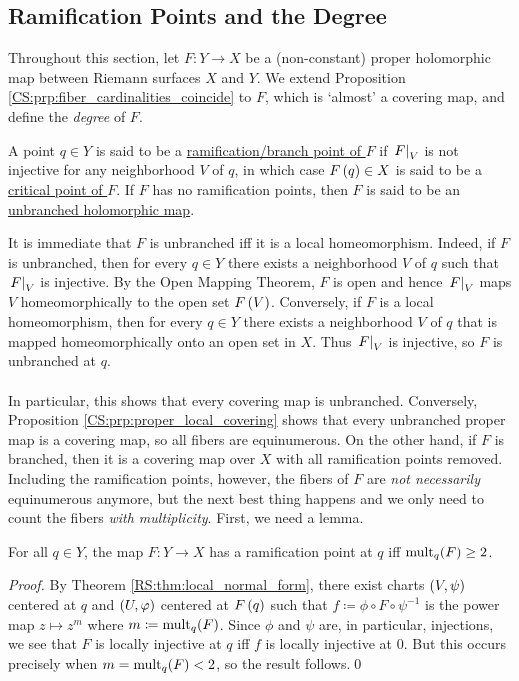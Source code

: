\documentclass[../Moduli_Spaces_of_Riemann_Surfaces.tex]{subfiles}
\begin{document}
    \subsection{Ramification Points and the Degree}
    Throughout this section, let $F:Y\to X$ be a (non-constant) proper holomorphic map between Riemann surfaces $X$ and $Y$. We extend Proposition \ref{CS:prp:fiber_cardinalities_coincide} to $F$, which is `almost' a covering map, and define the \textit{degree} of $F$.
    \begin{definition}
        A point $q\in Y$ is said to be a \ul{ramification/branch point of $F$} if $\left.F\right|_V$ is not injective for any neighborhood $V$ of $q$, in which case $F\left(q\right)\in X$ is said to be a \ul{critical point of $F$}. If $F$ has no ramification points, then $F$ is said to be an \ul{unbranched holomorphic map}.
    \end{definition}
    \begin{remark}
        It is immediate that $F$ is unbranched iff it is a local homeomorphism. Indeed, if $F$ is unbranched, then for every $q\in Y$ there exists a neighborhood $V$ of $q$ such that $\left.F\right|_V$ is injective. By the Open Mapping Theorem, $F$ is open and hence $\left.F\right|_V$ maps $V$ homeomorphically to the open set $F\left(V\right)$. Conversely, if $F$ is a local homeomorphism, then for every $q\in Y$ there exists a neighborhood $V$ of $q$ that is mapped homeomorphically onto an open set in $X$. Thus $\left.F\right|_V$ is injective, so $F$ is unbranched at $q$.\\\ \\
        In particular, this shows that every covering map is unbranched. Conversely, Proposition \ref{CS:prp:proper_local_covering} shows that every unbranched proper map is a covering map, so all fibers are equinumerous. On the other hand, if $F$ is branched, then it is a covering map over $X$ with all ramification points removed. Including the ramification points, however, the fibers of $F$ are \textit{not necessarily} equinumerous anymore, but the next best thing happens and we only need to count the fibers \textit{with multiplicity}. First, we need a lemma.\exqed
    \end{remark}
    \begin{lemma}\label{CS:lem:ramification_iff_mult_2}
        For all $q\in Y$, the map $F:Y\to X$ has a ramification point at $q$ iff $\operatorname{mult}_q\!\left(F\right)\geq2$.
    \end{lemma}
    \begin{proof}
        By Theorem \ref{RS:thm:local_normal_form}, there exist charts $\left(V,\psi\right)$ centered at $q$ and $\left(U,\varphi\right)$ centered at $F\left(q\right)$ such that $f\coloneqq\phi\circ F\circ\psi^{-1}$ is the power map $z\mapsto z^m$ where $m\coloneqq\operatorname{mult}_q\!\left(F\right)$. Since $\phi$ and $\psi$ are, in particular, injections, we see that $F$ is locally injective at $q$ iff $f$ is locally injective at $0$. But this occurs precisely when $m=\operatorname{mult}_q\!\left(F\right)<2$, so the result follows.\qed
    \end{proof}
\end{document}
